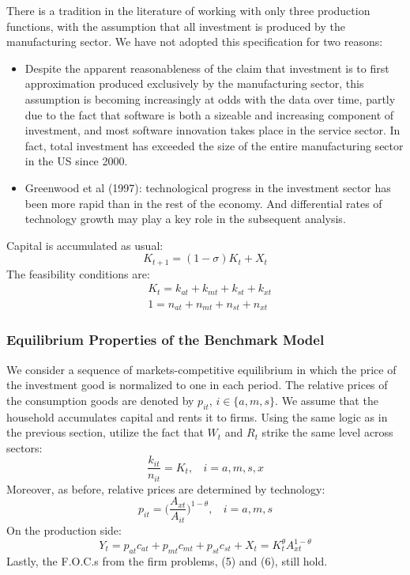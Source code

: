 \documentclass{article}
\begin{document}
    There is a tradition in the literature of working with only three production functions, with the assumption that all investment is produced by the manufacturing sector. We have not adopted this specification for two reasons:
    \begin{itemize}
        \item Despite the apparent reasonableness of the claim that investment is to first approximation produced exclusively by the manufacturing sector, this assumption is becoming increasingly at odds with the data over time, partly due to the fact that software is both a sizeable and increasing component of investment, and most software innovation takes place in the service sector. In fact, total investment has exceeded the size of the entire manufacturing sector in the US since 2000.
        \item Greenwood et al (1997): technological progress in the investment sector has been more rapid than in the rest of the economy. And differential rates of technology growth may play a key role in the subsequent analysis.
    \end{itemize}

    Capital is accumulated as usual:
    \begin{equation*}
        K_{t+1}=(1-\sigma)K_t+X_t
    \end{equation*}
    The feasibility conditions are:
    \begin{align*}
        &K_t=k_{at}+k_{mt}+k_{st}+k_{xt}\\
        &1=n_{at}+n_{mt}+n_{st}+n_{xt}
    \end{align*}

    \subsubsection{Equilibrium Properties of the Benchmark Model}
    We consider a sequence of markets-competitive equilibrium in which the price of the investment good is normalized to one in each period. The relative prices of the consumption goods are denoted by $p_{it}$, $i \in \{ a,m,s \}$. We assume that the household accumulates capital and rents it to firms. Using the same logic as in the previous section, utilize the fact that $W_t$ and $R_t$ strike the same level across sectors:
    \begin{equation}
        \frac{k_{it}}{n_{it}}=K_t,\ \ \ \ i=a,m,s,x
    \end{equation}
    Moreover, as before, relative prices are determined by technology:
    \begin{equation}
        p_{it}=\biggl( \frac{A_{xt}}{A_{it}} \biggr)^{1-\theta},\ \ \ \ i=a,m,s
    \end{equation}
    On the production side:
    \begin{equation}
        Y_t=p_{at}c_{at}+p_{mt}c_{mt}+p_{st}c_{st}+X_t=K_t^\theta A_{xt}^{1-\theta}
    \end{equation}
    Lastly, the F.O.C.s from the firm problems, (5) and (6), still hold.
\end{document}
